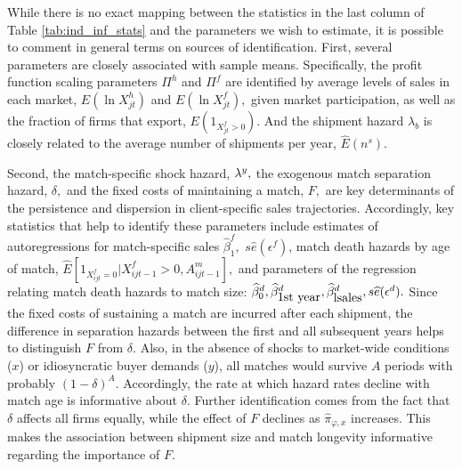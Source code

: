 While there is no exact mapping between the statistics in the last column of
Table \ref{tab:ind_inf_stats} and the parameters we wish to estimate, it is possible to comment in
general terms on sources of identification. First, several parameters are
closely associated with sample means. Specifically, the profit function
scaling parameters $\Pi ^{h}$ and $\Pi ^{f}$ are identified by average
levels of sales in each market, $E(\ln X_{jt}^{h})$ and $E(\ln X_{jt}^{f}),$
given market participation, as well as the fraction of firms that export, $%
E(1_{X_{jt}^{f}>0})$. And the shipment hazard $\lambda _{b}$ is closely
related to the average number of shipments per year, $\widehat{E}\left(
n^{s}\right) .$

Second, the match-specific shock hazard, ${\small \lambda }^{y},$ the
exogenous match separation hazard, $\delta ,$ and the fixed costs of
maintaining a match, $F,$ are key determinants of the persistence and
dispersion in client-specific sales trajectories. Accordingly, key
statistics that help to identify these parameters include estimates of
autoregressions for match-specific sales $\widehat{\beta }_{1}^{f},$ $s%
\widehat{e}(\epsilon ^{f})$, match death hazards by age of match, $\widehat{E%
}[1_{X_{ijt}^{f}=0}|X_{ijt-1}^{f}>0,A_{ijt-1}^{m}],$ and parameters of the
regression relating match death hazards to match size: $\widehat{\beta }%
_{0}^{d},\widehat{\beta }_{\mbox{1st year}}^{d},\widehat{\beta }_{%
\mbox{lsales}}^{d},s\widehat{e}(\epsilon ^{d}).$ Since the fixed costs of
sustaining a match are incurred after each shipment, the difference in
separation hazards between the first and all subsequent years helps to
distinguish $F$ from $\delta .$ Also, in the absence of shocks to
market-wide conditions ($x$) or idiosyncratic buyer demands ($y$), all
matches would survive $A$ periods with probably $(1-\delta )^{A}.$
Accordingly, the rate at which hazard rates decline with match age is
informative about $\delta .$ Further identification comes from the fact that 
$\delta $ affects all firms equally, while the effect of $F$ declines as $%
\widehat{\pi }_{\varphi ,x}$ increases. This makes the association between
shipment size and match longevity informative regarding the importance of $%
F. $

